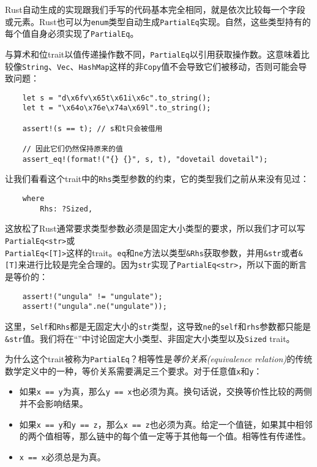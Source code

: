 Rust自动生成的实现跟我们手写的代码基本完全相同，就是依次比较每一个字段或元素。Rust也可以为\texttt{enum}类型自动生成\texttt{PartialEq}实现。自然，这些类型持有的每个值自身必须实现了\texttt{PartialEq}。

与算术和位trait以值传递操作数不同，\texttt{PartialEq}以引用获取操作数。这意味着比较像\texttt{String}、\texttt{Vec}、\texttt{HashMap}这样的非\texttt{Copy}值不会导致它们被移动，否则可能会导致问题：
\begin{verbatim}
    let s = "d\x6fv\x65t\x61i\x6c".to_string();
    let t = "\x64o\x76e\x74a\x69l".to_string();

    assert!(s == t); // s和t只会被借用

    // 因此它们仍然保持原来的值
    assert_eq!(format!("{} {}", s, t), "dovetail dovetail");
\end{verbatim}

让我们看看这个trait中的\texttt{Rhs}类型参数的约束，它的类型我们之前从来没有见过：
\begin{verbatim}
    where
        Rhs: ?Sized,
\end{verbatim}

这放松了Rust通常要求类型参数必须是固定大小类型的要求，所以我们才可以写\texttt{PartialEq<str>}或\\
\texttt{PartialEq<[T]>}这样的trait。\texttt{eq}和\texttt{ne}方法以类型\texttt{\&Rhs}获取参数，并用\texttt{\&str}或者\texttt{\&[T]}来进行比较是完全合理的。因为\texttt{str}实现了\texttt{PartialEq<str>}，所以下面的断言是等价的：
\begin{verbatim}
    assert!("ungula" != "ungulate");
    assert!("ungula".ne("ungulate"));
\end{verbatim}

这里，\texttt{Self}和\texttt{Rhs}都是无固定大小的\texttt{str}类型，这导致\texttt{ne}的\texttt{self}和\texttt{rhs}参数都只能是\texttt{\&str}值。我们将在“”中讨论固定大小类型、非固定大小类型以及\texttt{Sized} trait。

为什么这个trait被称为\texttt{PartialEq}？相等性是\emph{等价关系(equivalence relation)}的传统数学定义中的一种，等价关系需要满足三个要求。对于任意值\texttt{x}和\texttt{y}：
\begin{itemize}
    \item 如果\texttt{x == y}为真，那么\texttt{y == x}也必须为真。换句话说，交换等价性比较的两侧并不会影响结果。
    \item 如果\texttt{x == y}和\texttt{y == z}，那么\texttt{x == z}也必须为真。给定一个值链，如果其中相邻的两个值相等，那么链中的每个值一定等于其他每一个值。相等性有传递性。
    \item \texttt{x == x}必须总是为真。
\end{itemize}

